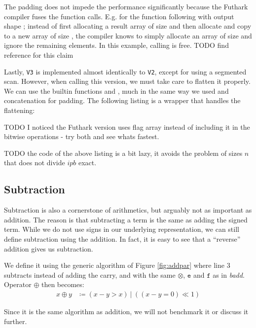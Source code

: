 

The padding does not impede the performance significantly because the Futhark
compiler fuses the function calls. E.g. for the function  
following  with output shape \fun{[n+p]}; instead of first
allocating a result array of size \fun{[n+p]} and then allocate and copy to a
new array of size \fun{[n]}, the compiler knows to simply allocate an array of
size \fun{[n]} and ignore the remaining  elements. In this example,
calling  is free. {\color{red} TODO find reference for this claim}

Lastly, \texttt{V3} is implemented almost identically to \texttt{V2}, except for
using a segmented scan. However, when calling this version, we must take care to
flatten it properly. We can use the builtin functions  and
, much in the same way we used  and concatenation for
padding. The following listing is a wrapper that handles the flattening:



{\color{red} TODO I noticed the Futhark version uses flag array instead of including it in the bitwise operations - try both and see whats fastest.}

{\color{red} TODO the code of the above listing is a bit lazy, it avoids the problem of sizes $n$ that does not divide $ipb$ exact.}

\subsection{Subtraction}
\label{subsec:sub}

Subtraction is also a cornerstone of arithmetics, but arguably not as important
as addition. The reason is that subtracting a term is the same as adding the
signed term. While we do not use signs in our underlying representation, we can
still define subtraction using the addition. In fact, it is easy to see that a
``reverse'' addition gives us subtraction.

We define it using the generic algorithm of Figure \ref{fig:addpar} where line 3
subtracts instead of adding the carry, and with the same $\otimes$, $\mathtt{e}$ and
$\mathtt{f}$ as in \textit{badd}. Operator $\oplus$ then becomes:
\begin{align}
  \label{eq:oplusopt}
  x \oplus y &\coloneq (x - y > x)~|~((x - y = 0) \ll 1)
\end{align}

Since it is the same algorithm as addition, we will not benchmark it or discuss
it further.

